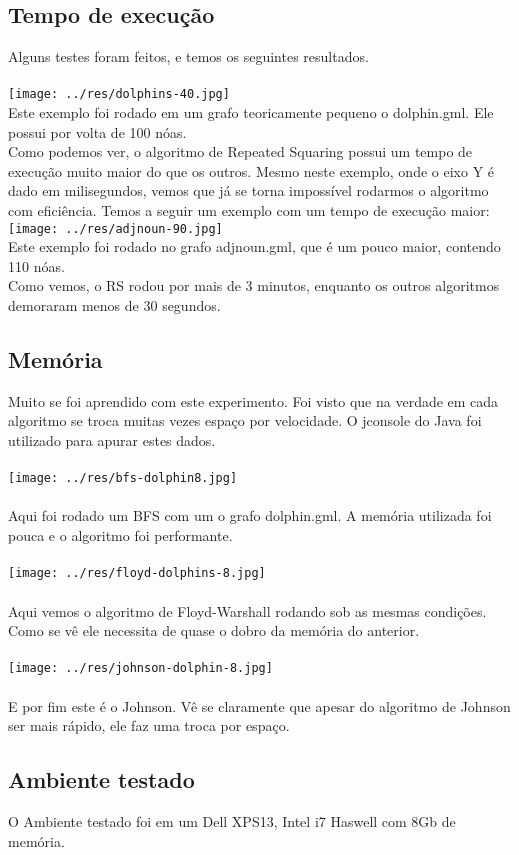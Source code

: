 \documentclass[a4paper,11pt,oneside]{article}
\begin{document}
    \subsection{Tempo de execu\c{c}\~ao}
    Alguns testes foram feitos, e temos os seguintes resultados.\\\\
    \texttt{[image: ../res/dolphins-40.jpg]}\\
    Este exemplo foi rodado em um grafo teoricamente pequeno o dolphin.gml. Ele possui por volta de 100 n\'oas.\\
    Como podemos ver, o algoritmo de Repeated Squaring possui um tempo de execu\c{c}\~ao muito maior do que os outros. Mesmo neste exemplo, onde o eixo Y \'e dado em milisegundos, vemos que j\'a se torna imposs\'ivel rodarmos o algoritmo com efici\^encia. Temos a seguir um exemplo com um tempo de execu\c{c}\~ao maior:\\
    \texttt{[image: ../res/adjnoun-90.jpg]}\\
    Este exemplo foi rodado no grafo adjnoun.gml, que \'e um pouco maior, contendo 110 n\'oas.\\
    Como vemos, o RS rodou por mais de 3 minutos, enquanto os outros algoritmos demoraram menos de 30 segundos.
    \subsection{Mem\'oria}
    Muito se foi aprendido com este experimento. Foi visto que na verdade em cada algoritmo se troca muitas vezes espa\c{c}o por velocidade. O jconsole do Java foi utilizado para apurar estes dados.\\\\
    \texttt{[image: ../res/bfs-dolphin8.jpg]}\\\\
    Aqui foi rodado um BFS com um o grafo dolphin.gml. A mem\'oria utilizada foi pouca e o algoritmo foi performante. \\\\
    \texttt{[image: ../res/floyd-dolphins-8.jpg]}\\\\
    Aqui vemos o algoritmo de Floyd-Warshall rodando sob as mesmas condi\c{c}\~oes. Como se v\^e ele necessita de quase o dobro da mem\'oria do anterior. \\\\
    \texttt{[image: ../res/johnson-dolphin-8.jpg]}\\\\
    E por fim este \'e o Johnson. V\^e se claramente que apesar do algoritmo de Johnson ser mais r\'apido, ele faz uma troca por espa\c{c}o.\\
    
    \subsection{Ambiente testado}
    O Ambiente testado foi em um Dell XPS13, Intel i7 Haswell com 8Gb de mem\'oria.
\end{document}
